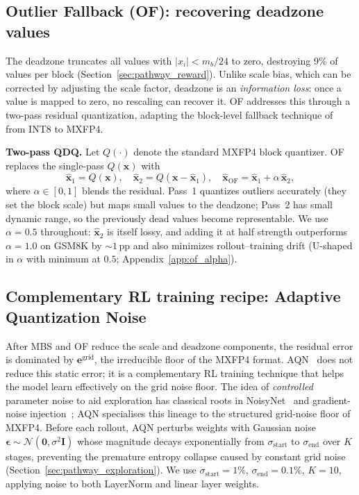 \documentclass{article}
\theoremstyle{definition}
\theoremstyle{remark}
\newcommand{\cN}{\mathcal{N}}
\newcommand{\bx}{\bm{x}}
\newcommand{\be}{\bm{e}}
\newcommand{\beps}{\bm{\epsilon}}
\begin{document}
\subsection{Outlier Fallback (OF): recovering deadzone values}
\label{sec:of}

The deadzone truncates all values with $|x_i| < m_b/24$ to zero, destroying 9\% of values per block (Section~\ref{sec:pathway_reward}). Unlike scale bias, which can be corrected by adjusting the scale factor, deadzone is an \emph{information loss}: once a value is mapped to zero, no rescaling can recover it. OF addresses this through a two-pass residual quantization, adapting the block-level fallback technique of \citet{zhang2025fallback} from INT8 to MXFP4.

\textbf{Two-pass QDQ.}
Let $Q(\cdot)$ denote the standard MXFP4 block quantizer. OF replaces the single-pass $Q(\bx)$ with
\begin{equation}
\label{eq:of_result}
  \hat{\bx}_1 = Q(\bx),\quad
  \hat{\bx}_2 = Q(\bx - \hat{\bx}_1),\quad
  \hat{\bx}_{\mathrm{OF}} = \hat{\bx}_1 + \alpha\,\hat{\bx}_2,
\end{equation}
where $\alpha\in[0,1]$ blends the residual. Pass~1 quantizes outliers accurately (they set the block scale) but maps small values to the deadzone; Pass~2 has small dynamic range, so the previously dead values become representable. We use $\alpha=0.5$ throughout: $\hat{\bx}_2$ is itself lossy, and adding it at half strength outperforms $\alpha=1.0$ on GSM8K by ${\sim}1$\,pp and also minimizes rollout--training drift (U-shaped in $\alpha$ with minimum at $0.5$; Appendix~\ref{app:of_alpha}).

\subsection{Complementary RL training recipe: Adaptive Quantization Noise}
\label{sec:aqn}

After MBS and OF reduce the scale and deadzone components, the residual error is dominated by $\be^{\mathrm{grid}}$, the irreducible floor of the MXFP4 format. AQN~\citep{huang2025qerl} does not reduce this static error; it is a complementary RL training technique that helps the model learn effectively on the grid noise floor. The idea of \emph{controlled} parameter noise to aid exploration has classical roots in NoisyNet~\citep{fortunato2018noisynet} and gradient-noise injection~\citep{neelakantan2015adding}; AQN specialises this lineage to the structured grid-noise floor of MXFP4. Before each rollout, AQN perturbs weights with Gaussian noise $\beps \sim \cN(\bm{0}, \sigma^2\bm{I})$ whose magnitude decays exponentially from $\sigma_{\mathrm{start}}$ to $\sigma_{\mathrm{end}}$ over $K$ stages, preventing the premature entropy collapse caused by constant grid noise (Section~\ref{sec:pathway_exploration}). We use $\sigma_{\mathrm{start}}{=}1\%$, $\sigma_{\mathrm{end}}{=}0.1\%$, $K{=}10$, applying noise to both LayerNorm and linear layer weights.
\end{document}
